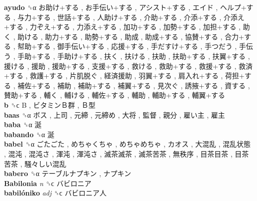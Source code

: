 \textbf{ayudo} ␝α   お助け+する ,  お手伝い+する ,  アシスト+する ,  エイド ,  ヘルプ+する ,  与力+する ,  世話+する ,  人助け+する ,  介助+する ,  介添+する ,  介添え+する ,  力ぞえ+する ,  力添え+する ,  加功+する ,  加勢+する ,  加担+する ,  助く ,  助ける ,  助力+する ,  助勢+する ,  助成 ,  助成+する ,  協賛+する ,  合力+する ,  幇助+する ,  御手伝い+する ,  応援+する ,  手だすけ+する ,  手つだう ,  手伝う ,  手助+する ,  手助け+する ,  扶く ,  扶ける ,  扶助 ,  扶助+する ,  扶翼+する ,  援ける ,  援助 ,  援助+する ,  支援+する ,  救ける ,  救助+する ,  救援+する ,  救済+する ,  救護+する ,  片肌脱ぐ ,  経済援助 ,  羽翼+する ,  肩入れ+する ,  荷担+する ,  補佐+する ,  補助 ,  補助+する ,  補翼+する ,  見次ぐ ,  誘掖+する ,  資する ,  賛助+する ,  輔く ,  輔ける ,  輔佐+する ,  輔助 ,  輔助+する ,  輔翼+する   \\
\textbf{b} ␝ϲ   B ,  ビタミンＢ群 ,  Ｂ型   \\
\textbf{baas} ␝α   ボス ,  上司 ,  元締 ,  元締め ,  大将 ,  監督 ,  親分 ,  雇い主 ,  雇主   \\
\textbf{baba} ␝α   涎   \\
\textbf{babando} ␝α   涎   \\
\textbf{babel} ␝α   ごたごた ,  めちゃくちゃ ,  めちゃめちゃ ,  カオス ,  大混乱 ,  混乱状態 ,  混沌 ,  混沌さ ,  渾沌 ,  渾沌さ ,  滅茶滅茶 ,  滅茶苦茶 ,  無秩序 ,  目茶目茶 ,  目茶苦茶 ,  騒々しい混乱   \\
\textbf{babero} ␝α   テーブルナプキン ,  ナプキン   \\
\textbf{Babilonia} \emph{n}  ␝ϲ   バビロニア   \\
\textbf{babilóniko} \emph{adj}  ␝ϲ   バビロニア人   \\
